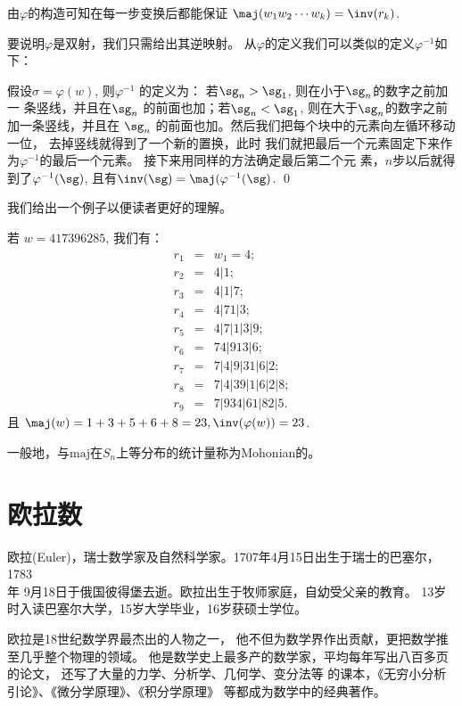 由$\varphi$的构造可知在每一步变换后都能保证
$\maj(w_1w_2\cdots w_k)=\inv(r_k)$.　

要说明$\varphi$是双射，我们只需给出其逆映射。
从$\varphi$的定义我们可以类似的定义$\varphi^{-1}$如下：

假设$\sigma=\varphi(w)$, 则$\varphi^{-1}$ 的定义为：
若$\sg_n>\sg_1$, 则在小于$\sg_n$的数字之前加一 条竖线，并且在$\sg_n$
的前面也加；若$\sg_n<\sg_1$,
则在大于$\sg_n$的数字之前加一条竖线，并且在 $\sg_n$
的前面也加。然后我们把每个块中的元素向左循环移动一位，
去掉竖线就得到了一个新的置换，此时
我们就把最后一个元素固定下来作为$\varphi^{-1}$的最后一个元素。
接下来用同样的方法确定最后第二个元
素，$n$步以后就得到了$\varphi^{-1}(\sg)$,
且有$\inv(\sg)=\maj(\varphi^{-1}(\sg)$. \qed


我们给出一个例子以便读者更好的理解。

\begin{exa}
若 $w=417396285$, 我们有：
\begin{eqnarray*}
r_1  &=& w_1=4;\\
r_2  &=& 4|1;\\
r_3  &=& 4|1|7;\\
r_4  &=& 4|71|3;\\
r_5  &=& 4|7|1|3|9;\\
r_6  &=& 74|913|6;\\
r_7  &=& 7|4|9|31|6|2;\\
r_8  &=& 7|4|39|1|6|2|8;\\
r_9  &=& 7|934|61|82|5.
\end{eqnarray*}
且 $\maj(w)=1+3+5+6+8=23, \inv(\varphi(w))=23$.
\end{exa}

一般地，与$\mathrm{maj}$在$S_n$上等分布的统计量称为Mohonian的。




\section{欧拉数}

欧拉(Euler)，瑞士数学家及自然科学家。1707年4月15日出生于瑞士的巴塞尔，1783\\年
9月18日于俄国彼得堡去逝。欧拉出生于牧师家庭，自幼受父亲的教育。
13岁时入读巴塞尔大学，15岁大学毕业，16岁获硕士学位。

欧拉是18世纪数学界最杰出的人物之一，
他不但为数学界作出贡献，更把数学推至几乎整个物理的领域。
他是数学史上最多产的数学家，平均每年写出八百多页的论文，
还写了大量的力学、分析学、几何学、变分法等
的课本，《无穷小分析引论》、《微分学原理》、《积分学原理》
等都成为数学中的经典著作。

